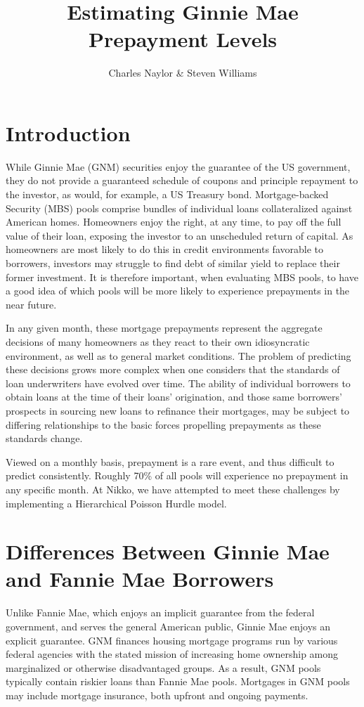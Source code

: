 \documentclass{article}
\begin{document}
\title{Estimating Ginnie Mae Prepayment Levels}
\author{Charles Naylor \& Steven Williams}
\maketitle
\section{Introduction}

While Ginnie Mae (GNM) securities enjoy the guarantee of the US government, they do not provide a guaranteed schedule of coupons and principle repayment to the investor, as would, for example, a US Treasury bond. Mortgage-backed Security (MBS) pools comprise bundles of individual loans collateralized against American homes. Homeowners enjoy the right, at any time, to pay off the full value of their loan, exposing the investor to an unscheduled return of capital. As homeowners are most likely to do this in credit environments favorable to borrowers, investors may struggle to find debt of similar yield to replace their former investment. It is therefore important, when evaluating MBS pools, to have a good idea of which pools will be more likely to experience prepayments in the near future.

In any given month, these mortgage prepayments represent the aggregate decisions of many homeowners as they react to their own idiosyncratic environment, as well as to general market conditions. The problem of predicting these decisions grows more complex when one considers that the standards of loan underwriters have evolved over time. The ability of individual borrowers to obtain loans at the time of their loans' origination, and those same borrowers' prospects in sourcing new loans to refinance their mortgages, may be subject to differing relationships to the basic forces propelling prepayments as these standards change.

Viewed on a monthly basis, prepayment is a rare event, and thus difficult to predict consistently. Roughly 70\% of all pools will experience no prepayment in any specific month. At Nikko, we have attempted to meet these challenges by implementing a Hierarchical Poisson Hurdle model. 
\section{Differences Between Ginnie Mae and Fannie Mae Borrowers}
Unlike Fannie Mae, which enjoys an implicit guarantee from the federal government, and serves the general American public, Ginnie Mae enjoys an explicit guarantee. GNM finances housing mortgage programs run by various federal agencies with the stated mission of increasing home ownership among marginalized or otherwise disadvantaged groups. As a result, GNM pools typically contain riskier loans than Fannie Mae pools. Mortgages in GNM pools may include mortgage insurance, both upfront and ongoing payments.
\end{document}

